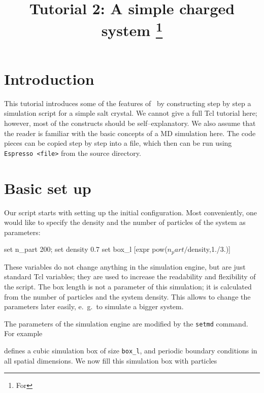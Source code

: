 \documentclass[
a4paper,                        %
11pt,                           %
twoside,                        %
footsepline,                    %
headsepline,                    %
headexclude,                    %
footexclude,                    %
pagesize,                       %
]{scrartcl}
\begin{document}
\esptitlehead
\title{Tutorial 2: A simple charged system%
\ifdefined\esversion%
\thanks{For \es \esversion}%
\fi%
}

\maketitle
\tableofcontents

\section{Introduction}

This tutorial introduces some of the features of \es\ by constructing
step by step a simulation script for a simple salt crystal.  We cannot
give a full Tcl tutorial here; however, most of the constructs should
be self--explanatory. We also assume that the reader is familiar with
the basic concepts of a MD simulation here. The code pieces can be
copied step by step into a file, which then can be run using
\verb|Espresso <file>| from the \es source directory.

\section{Basic set up}

Our script starts with setting up the initial configuration.  Most
conveniently, one would like to specify the density and the number of
particles of the system as parameters:

\begin{tclcode}
  set n_part 200; set density 0.7
  set box_l [expr pow($n_part/$density,1./3.)]
\end{tclcode}

These variables do not change anything in the simulation engine, but
are just standard Tcl variables; they are used to increase the
readability and flexibility of the script. The box length is not a
parameter of this simulation; it is calculated from the number of
particles and the system density. This allows to change the parameters
later easily, e.~g.\ to simulate a bigger system.

The parameters of the simulation engine are modified by the
\verb|setmd| command. For example


defines a cubic simulation box of size \verb|box_l|, and periodic
boundary conditions in all spatial dimensions. We now fill this
simulation box with particles
\end{document}
